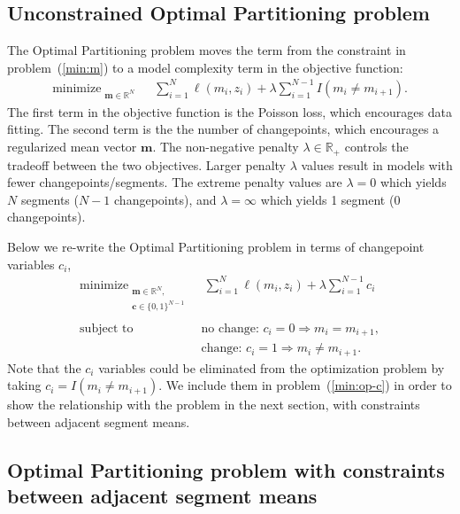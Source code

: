 \documentclass[article]{jss}
\DeclareMathOperator*{\minimize}{minimize}
\newcommand{\RR}{\mathbb R}
\begin{document}
\subsection{Unconstrained Optimal Partitioning problem}

The Optimal Partitioning problem moves the term from the constraint in
problem~(\ref{min:m}) to a model complexity term in the objective
function:
\begin{align}
  \label{min:op}
  \minimize_{
  \substack{
  \mathbf m\in\RR^N
  }
  } &\ \ 
      \sum_{i=1}^N \ell(m_i, z_i) + \lambda \sum_{i=1}^{N-1} I(m_i\neq m_{i+1}).
\end{align}
The first term in the objective function is the Poisson loss, which
encourages data fitting. The second term is the the number of
changepoints, which encourages a regularized mean vector $\mathbf m$. The
non-negative penalty $\lambda\in\RR_+$ controls the tradeoff between
the two objectives. Larger penalty $\lambda$ values result in models
with fewer changepoints/segments. The extreme penalty values are
$\lambda=0$ which yields $N$ segments ($N-1$ changepoints), and
$\lambda=\infty$ which yields 1 segment (0 changepoints).

Below we re-write the Optimal Partitioning problem in terms of
changepoint variables $c_i$,
\begin{align}
  \label{min:op-c}
  \minimize_{
  \substack{
  \mathbf m\in\RR^N,\\
  \mathbf c\in\{0,1\}^{N-1}\\
  }
  } &\ \ 
      \sum_{i=1}^N \ell(m_i, z_i) + \lambda \sum_{i=1}^{N-1} c_i \\
  \text{subject to\ \ \ } &\ \text{no change: }c_i = 0 \Rightarrow m_i = m_{i+1}, \nonumber\\
    &\ \text{change: }c_i = 1 \Rightarrow m_i \neq m_{i+1}.\nonumber
\end{align}
Note that the $c_i$ variables could be eliminated from the
optimization problem by taking $c_i=I(m_i\neq m_{i+1})$. We include
them in problem~(\ref{min:op-c}) in order to show the relationship
with the problem in the next section, with constraints between
adjacent segment means.

\subsection{Optimal Partitioning problem with constraints between adjacent segment means}
\end{document}

